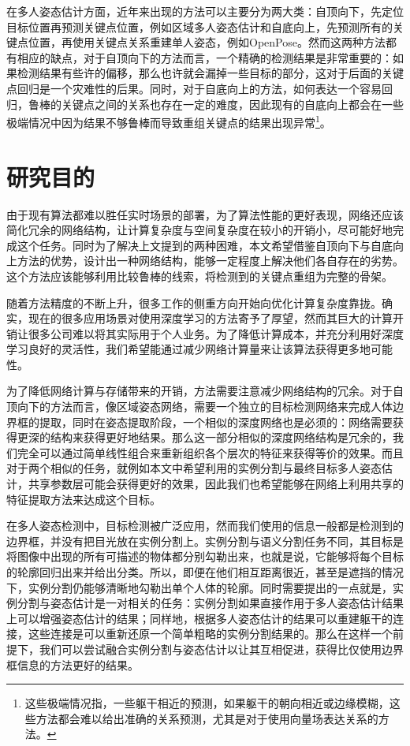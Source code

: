 在多人姿态估计方面，近年来出现的方法可以主要分为两大类：自顶向下，先定位目标位置再预测关键点位置，例如区域多人姿态估计\cite{fang2017rmpe}和自底向上，先预测所有的关键点位置，再使用关键点关系重建单人姿态，例如OpenPose\cite{Cao2016Realtime}。然而这两种方法都有相应的缺点，对于自顶向下的方法而言，一个精确的检测结果是非常重要的：如果检测结果有些许的偏移，那么也许就会漏掉一些目标的部分，这对于后面的关键点回归是一个灾难性的后果。同时，对于自底向上的方法，如何表达一个容易回归，鲁棒的关键点之间的关系也存在一定的难度，因此现有的自底向上都会在一些极端情况中因为结果不够鲁棒而导致重组关键点的结果出现异常\footnote{这些极端情况指，一些躯干相近的预测，如果躯干的朝向相近或边缘模糊，这些方法都会难以给出准确的关系预测，尤其是对于使用向量场表达关系的方法。}。

\section{研究目的}
\label{sec:generalmotivation}
由于现有算法都难以胜任实时场景的部署，为了算法性能的更好表现，网络还应该简化冗余的网络结构，让计算复杂度与空间复杂度在较小的开销小，尽可能好地完成这个任务。同时为了解决上文提到的两种困难，本文希望借鉴自顶向下与自底向上方法的优势，设计出一种网络结构，能够一定程度上解决他们各自存在的劣势。这个方法应该能够利用比较鲁棒的线索，将检测到的关键点重组为完整的骨架。

随着方法精度的不断上升，很多工作的侧重方向开始向优化计算复杂度靠拢。确实，现在的很多应用场景对使用深度学习的方法寄予了厚望，然而其巨大的计算开销让很多公司难以将其实际用于个人业务。为了降低计算成本，并充分利用好深度学习良好的灵活性，我们希望能通过减少网络计算量来让该算法获得更多地可能性。

为了降低网络计算与存储带来的开销，方法需要注意减少网络结构的冗余。对于自顶向下的方法而言，像区域姿态网络\cite{fang2017rmpe}，需要一个独立的目标检测网络来完成人体边界框的提取，同时在姿态提取阶段，一个相似的深度网络也是必须的：网络需要获得更深的结构来获得更好地结果。那么这一部分相似的深度网络结构是冗余的，我们完全可以通过简单线性组合来重新组织各个层次的特征来获得等价的效果。而且对于两个相似的任务，就例如本文中希望利用的实例分割与最终目标多人姿态估计，共享参数层可能会获得更好的效果，因此我们也希望能够在网络上利用共享的特征提取方法来达成这个目标。

在多人姿态检测中，目标检测被广泛应用，然而我们使用的信息一般都是检测到的边界框，并没有把目光放在实例分割上。实例分割与语义分割任务不同，其目标是将图像中出现的所有可描述的物体都分别勾勒出来，也就是说，它能够将每个目标的轮廓回归出来并给出分类。所以，即便在他们相互距离很近，甚至是遮挡的情况下，实例分割仍能够清晰地勾勒出单个人体的轮廓。同时需要提出的一点就是，实例分割与姿态估计是一对相关的任务：实例分割如果直接作用于多人姿态估计结果上可以增强姿态估计的结果；同样地，根据多人姿态估计的结果可以重建躯干的连接，这些连接是可以重新还原一个简单粗略的实例分割结果的。那么在这样一个前提下，我们可以尝试融合实例分割与姿态估计以让其互相促进，获得比仅使用边界框信息的方法更好的结果。

